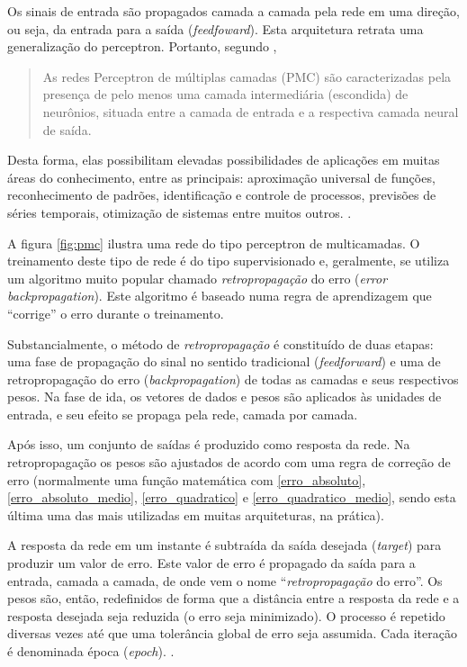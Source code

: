 Os sinais de entrada são propagados camada a camada pela rede em uma direção, ou seja, da entrada para a saída (\textit{feedfoward}). Esta arquitetura retrata uma generalização do perceptron. Portanto, segundo \cite[p. 26]{silva_redes_2016}, \begin{quote}
	As redes Perceptron de múltiplas camadas (PMC) são caracterizadas pela presença de pelo menos uma camada intermediária (escondida) de neurônios, situada entre a camada de entrada e a respectiva camada neural de saída.
\end{quote}

Desta forma, elas possibilitam elevadas possibilidades de aplicações em muitas áreas do conhecimento, entre as principais: aproximação universal de funções, reconhecimento de padrões, identificação e controle de processos, previsões de séries temporais, otimização de sistemas entre muitos outros. \cite{haykin_redes_2001}.

A figura \ref{fig:pmc} ilustra uma rede do tipo perceptron de multicamadas. O treinamento deste tipo de rede é do tipo supervisionado e, geralmente, se utiliza um algoritmo muito popular chamado \textit{retropropagação} do erro (\textit{error backpropagation}). Este algoritmo é baseado numa regra de aprendizagem que “corrige” o erro durante o treinamento. \cite{haykin_redes_2001}

Substancialmente, o método de \textit{retropropagação} é constituído de duas etapas: uma fase de propagação do sinal no sentido tradicional (\textit{feedforward}) e uma de retropropagação do erro (\textit{backpropagation}) de todas as camadas e seus respectivos pesos. Na fase de ida, os vetores de dados e pesos são aplicados às unidades de entrada, e seu efeito se propaga pela rede, camada por camada. \cite{hagan_neural_1996} \cite{haykin_redes_2001}

Após isso, um conjunto de saídas é produzido como resposta da rede. Na retropropagação os pesos são ajustados de acordo com uma regra de correção de erro (normalmente uma função matemática com \ref{erro_absoluto}, \ref{erro_absoluto_medio}, \ref{erro_quadratico} e \ref{erro_quadratico_medio}, sendo esta última uma das mais utilizadas em muitas arquiteturas, na prática). \cite{haykin_redes_2001} \cite{hagan_neural_1996} \cite{yeung_neural_2004}

A resposta da rede em um instante é subtraída da saída desejada (\textit{target}) para produzir um valor de erro. Este valor de erro é propagado da saída para a entrada, camada a camada, de onde vem o nome “\textit{retropropagação} do erro”. Os pesos são, então, redefinidos de forma que a distância entre a resposta da rede e a resposta desejada seja reduzida (o erro seja minimizado). O processo é repetido diversas vezes até que uma tolerância global de erro seja assumida. Cada iteração é denominada época (\textit{epoch}). \cite{haykin_redes_2001} \cite{hagan_neural_1996} \cite{minsky_perceptrons:_1969}.

